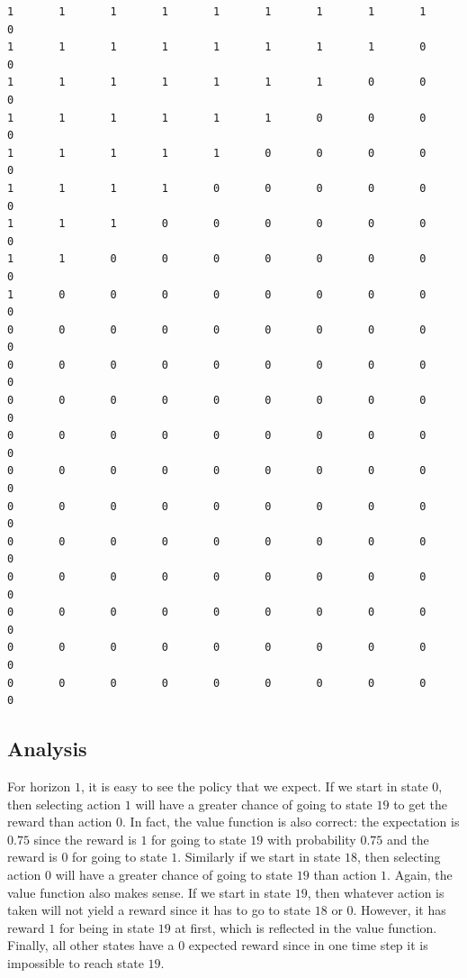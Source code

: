 \documentclass[paper=a4, fontsize=11pt]{scrartcl}
\begin{document}
\begin{verbatim}
1       1       1       1       1       1       1       1       1       0
1       1       1       1       1       1       1       1       0       0
1       1       1       1       1       1       1       0       0       0
1       1       1       1       1       1       0       0       0       0
1       1       1       1       1       0       0       0       0       0
1       1       1       1       0       0       0       0       0       0
1       1       1       0       0       0       0       0       0       0
1       1       0       0       0       0       0       0       0       0
1       0       0       0       0       0       0       0       0       0
0       0       0       0       0       0       0       0       0       0
0       0       0       0       0       0       0       0       0       0
0       0       0       0       0       0       0       0       0       0
0       0       0       0       0       0       0       0       0       0
0       0       0       0       0       0       0       0       0       0
0       0       0       0       0       0       0       0       0       0
0       0       0       0       0       0       0       0       0       0
0       0       0       0       0       0       0       0       0       0
0       0       0       0       0       0       0       0       0       0
0       0       0       0       0       0       0       0       0       0
0       0       0       0       0       0       0       0       0       0
\end{verbatim}

\subsection{Analysis}

For horizon $1$, it is easy to see the policy that we expect. If we start in state $0$, then selecting action $1$ will have a greater chance of going to state $19$ to get the reward than action $0$. In fact, the value function is also correct: the expectation is $0.75$ since the reward is $1$ for going to state $19$ with probability $0.75$ and the reward is $0$ for going to state $1$. Similarly if we start in state $18$, then selecting action $0$ will have a greater chance of going to state $19$ than action $1$. Again, the value function also makes sense. If we start in state $19$, then whatever action is taken will not yield a reward since it has to go to state $18$ or $0$. However, it has reward $1$ for being in state $19$ at first, which is reflected in the value function. Finally, all other states have a $0$ expected reward since in one time step it is impossible to reach state $19$.
\end{document}
